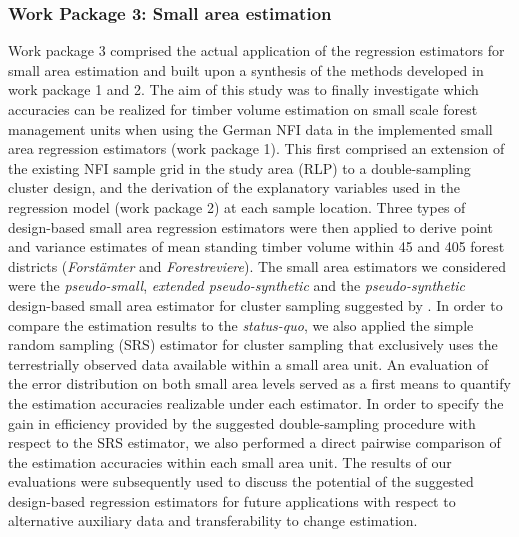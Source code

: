 
\subsubsection{Work Package 3: Small area estimation} %


Work package 3 comprised the actual application of the regression estimators for small area estimation and built upon a synthesis of the methods developed in work package 1 and 2. The aim of this study was to finally investigate which accuracies can be realized for timber volume estimation on small scale forest management units when using the German NFI data in the implemented small area regression estimators (work package 1). This first comprised an extension of the existing NFI sample grid in the study area (RLP) to a double-sampling cluster design, and the derivation of the explanatory variables used in the regression model (work package 2) at each sample location. Three types of design-based small area regression estimators were then applied to derive point and variance estimates of mean standing timber volume within 45 and 405 forest districts (\textit{Forst{\"a}mter} and \textit{Forestreviere}). The small area estimators we considered were the \textit{pseudo-small}, \textit{extended pseudo-synthetic} and the \textit{pseudo-synthetic} design-based small area estimator for cluster sampling suggested by \citet{mandallaz2013a, mandallaz2013b}. In order to compare the estimation results to the \textit{status-quo}, we also applied the simple random sampling (SRS) estimator for cluster sampling that exclusively uses the terrestrially observed data available within a small area unit. An evaluation of the error distribution on both small area levels served as a first means to quantify the estimation accuracies realizable under each estimator. In order to specify the gain in efficiency provided by the suggested double-sampling procedure with respect to the SRS estimator, we also performed a direct pairwise comparison of the estimation accuracies within each small area unit. The results of our evaluations were subsequently used to discuss the potential of the suggested design-based regression estimators for future applications with respect to alternative auxiliary data and transferability to change estimation.

